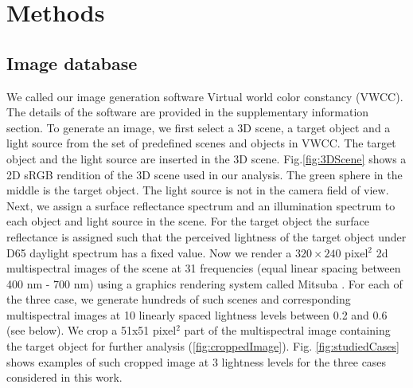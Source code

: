 \documentclass{jov}
\begin{document}
\section{Methods}
\subsection{Image database} \label{method:VirtualWorld}
We called our image generation software Virtual world color constancy (VWCC). The details of the software are provided in the supplementary information section. To generate an image, we first select a 3D scene, a target object and a light source from the set of predefined scenes and objects in VWCC. The target object and the light source are inserted in the 3D scene. Fig.\ref{fig:3DScene} shows a 2D sRGB rendition of the 3D scene used in our analysis. The green sphere in the middle is the target object. The light source is not in the camera field of view. Next, we assign a surface reflectance spectrum and an illumination spectrum to each object and light source in the scene. For the target object the surface reflectance is assigned such that the perceived lightness of the target object under D65 daylight spectrum has a fixed value. Now we render a $320\times 240$ pixel$^2$ 2d multispectral images of the scene at 31 frequencies (equal linear spacing between 400 nm - 700 nm) using a graphics rendering system called Mitsuba \cite{jakob2015mitsuba}. For each of the three case, we generate hundreds of such scenes and corresponding multispectral images at 10 linearly spaced lightness levels between 0.2 and 0.6 (see below). We crop a 51x51 pixel$^2$ part of the multispectral image containing the target object for further analysis (\ref{fig:croppedImage}). Fig. \ref{fig:studiedCases} shows examples of such cropped image at 3 lightness levels for the three cases considered in this work.
\end{document}
